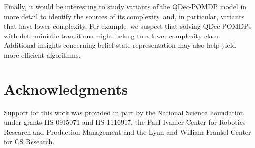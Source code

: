 \documentclass[letterpaper]{article}
\theoremstyle{definition}
\begin{document}
Finally, it would be interesting to study variants of the QDec-POMDP model in more detail to identify the sources of its complexity, and, in particular, variants that have lower complexity. For example, we suspect that solving QDec-POMDPs with deterministic transitions might belong to a lower complexity class. Additional insights concerning belief state representation may also help yield more efficient algorithms.

\section{Acknowledgments}

Support for this work was provided in part by the National Science Foundation under grants IIS-0915071 and IIS-1116917, the Paul Ivanier Center for Robotics Research and Production Management and the Lynn and William Frankel Center for CS Research.





\newpage


\clearpage

\end{document}
